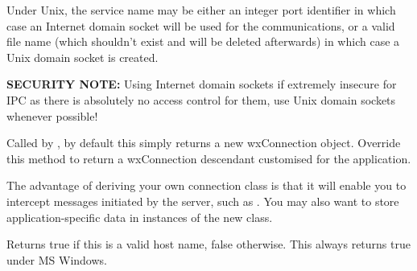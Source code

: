Under Unix, the service name may be either an integer port
identifier in which case an Internet domain socket will be used
for the communications, or a valid file name (which shouldn't
exist and will be deleted afterwards) in which case a Unix domain
socket is created.

{\bf SECURITY NOTE:} Using Internet domain sockets if extremely
insecure for IPC as there is absolutely no access control for
them, use Unix domain sockets whenever possible!

\label{wxclientonmakeconnection}


Called by , by
default this simply returns a new wxConnection object. Override
this method to return a wxConnection descendant customised for the
application.

The advantage of deriving your own connection class is that it
will enable you to intercept messages initiated by the server,
such as . You
may also want to store application-specific data in instances of
the new class.

\label{wxclientvalidhost}


Returns true if this is a valid host name, false otherwise. This always
returns true under MS Windows.

